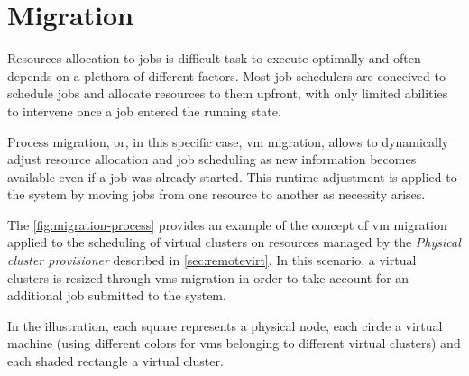 \chapter{Migration}
\label{sec:migration}

Resources allocation to jobs is difficult task to execute optimally and often depends on a plethora of different factors. Most job schedulers are conceived to schedule jobs and allocate resources to them upfront, with only limited abilities to intervene once a job entered the running state.

Process migration, or, in this specific case, \gls{vm} migration, allows to dynamically adjust resource allocation and job scheduling as new information becomes available even if a job was already started. This runtime adjustment is applied to the system by moving jobs from one resource to another as necessity arises.

The \autoref{fig:migration-process} provides an example of the concept of \gls{vm} migration applied to the scheduling of virtual clusters on resources managed by the \emph{Physical cluster provisioner} described in \autoref{sec:remotevirt}. In this scenario, a virtual clusters is resized through \glspl{vm} migration in order to take account for an additional job submitted to the system.

In the illustration, each square represents a physical node, each circle a virtual machine (using different colors for \glspl{vm} belonging to different virtual clusters) and each shaded rectangle a virtual cluster.

